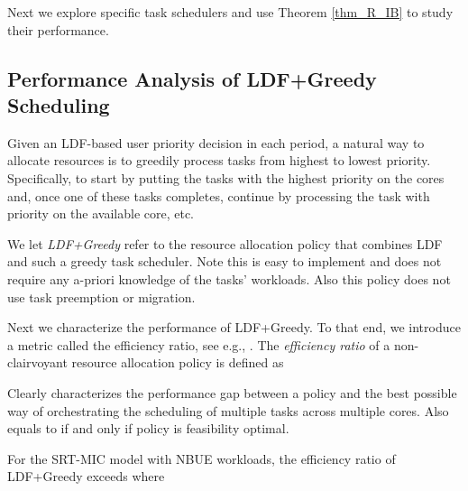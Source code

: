 \documentclass[prodmode,acmtompecs]{acmsmall}
\newcommand{\myComments}[1]{}
\newif\ifdissertation
\newcommand{\dissertationStart}{\ifdissertation  \myComments{Dissertation version: }}
\newcommand{\commentEnd}{\myComments{End}}
\begin{document}
Next we explore specific task schedulers and use Theorem \ref{thm_R_IB} to study their performance. 

\dissertationStart
Note that Theorem \ref{thm_R_IB} applies beyond the SRT-MIC model when the LDF policy is used but in a general setting where  represent the expected payoffs under priority decision  and users require long-term time-averaged payoff  per period. The LDF policy can also be generalized to a class of weighted LDF policies. This general result is further developed in [?]. 
\commentEnd\fi

\subsection{Performance Analysis of LDF+Greedy Scheduling}
Given an LDF-based user priority decision in each period, a natural way to allocate resources is to greedily process tasks from highest to lowest priority. Specifically, to start by putting the  tasks with the highest priority on the  cores and, once one of these tasks completes, continue by processing the task with priority  on the available core, etc.  

We let {\em LDF+Greedy} refer to the resource allocation policy that combines LDF and such a greedy task scheduler. Note this is easy to implement and does not require any a-priori knowledge of the tasks' workloads. Also this policy does not use task preemption or migration. 

Next we characterize the performance of LDF+Greedy. To that end, we introduce a metric called the efficiency ratio, see e.g., \cite{JLS07A}. The {\em efficiency ratio} of a non-clairvoyant resource allocation policy  is defined as 

Clearly  characterizes the performance gap between a policy  and the best possible way of orchestrating the scheduling of multiple tasks across multiple cores. Also  equals to  if and only if policy  is feasibility optimal. 

\begin{theorem}
\label{thm_LDF_greedy_eff_ratio}
For the SRT-MIC model with NBUE workloads, the efficiency ratio of LDF+Greedy exceeds  where

\end{theorem}
\end{document}
